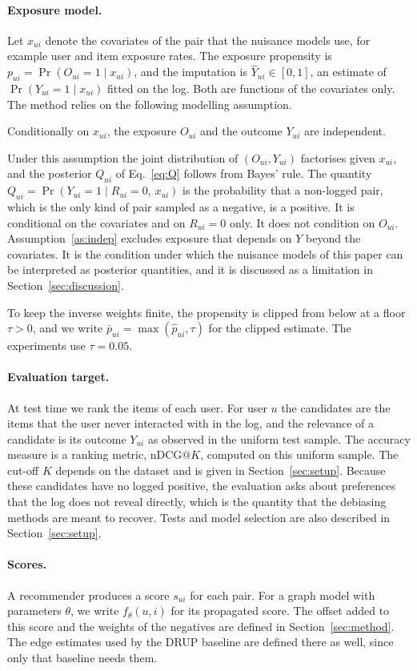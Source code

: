 \paragraph{Exposure model.}
Let $x_{ui}$ denote the covariates of the pair that the nuisance models use, for example
user and item exposure rates. The exposure propensity is
$p_{ui}=\Pr(O_{ui}=1\mid x_{ui})$, and the imputation is
$\hat Y_{ui}\in[0,1]$, an estimate of $\Pr(Y_{ui}=1\mid x_{ui})$ fitted on the log.
Both are functions of the covariates only. The method relies on the following
modelling assumption.
\begin{assumption}\label{as:indep}
Conditionally on $x_{ui}$, the exposure $O_{ui}$ and the outcome $Y_{ui}$ are independent.
\end{assumption}
Under this assumption the joint distribution of $(O_{ui},Y_{ui})$ factorises given
$x_{ui}$, and the posterior $Q_{ui}$ of Eq.~\eqref{eq:Q} follows from Bayes' rule. The
quantity $Q_{ui}=\Pr(Y_{ui}=1\mid R_{ui}=0,\,x_{ui})$ is the probability that a
non-logged pair, which is the only kind of pair sampled as a negative, is a positive. It
is conditional on the covariates and on $R_{ui}=0$ only. It does not condition on $O_{ui}$.
Assumption~\ref{as:indep} excludes exposure that depends on $Y$ beyond the covariates. It
is the condition under which the nuisance models of this paper can be interpreted as
posterior quantities, and it is discussed as a limitation in Section~\ref{sec:discussion}.

To keep the inverse weights finite, the propensity is clipped from below at a floor
$\tau>0$, and we write $\bar p_{ui}=\max(\hat p_{ui},\tau)$ for the clipped estimate. The
experiments use $\tau=0.05$.

\paragraph{Evaluation target.}
At test time we rank the items of each user. For user $u$ the candidates are the items
that the user never interacted with in the log, and the relevance of a candidate is its
outcome $Y_{ui}$ as observed in the uniform test sample. The accuracy measure is a ranking metric,
nDCG$@K$, computed on this uniform sample. The cut-off $K$ depends on the dataset and
is given in Section~\ref{sec:setup}. Because these candidates have no logged positive, the
evaluation asks about preferences that the log does not reveal directly, which is the
quantity that the debiasing methods are meant to recover. Tests and model selection are
also described in Section~\ref{sec:setup}.

\paragraph{Scores.}
A recommender produces a score $s_{ui}$ for each pair. For a graph model with parameters
$\theta$, we write $f_\theta(u,i)$ for its propagated score. The offset added to this
score and the weights of the negatives are defined in Section~\ref{sec:method}. The edge
estimates used by the DRUP baseline are defined there as well, since only that baseline
needs them.
